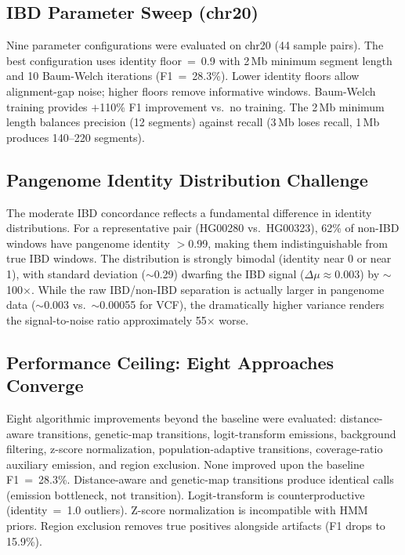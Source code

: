 \documentclass[11pt]{article}
\begin{document}
\subsection{IBD Parameter Sweep (chr20)}
\label{sec:supp_ibd_params}

Nine parameter configurations were evaluated on chr20 (44 sample pairs). The best configuration uses identity floor~=~0.9 with 2\,Mb minimum segment length and 10 Baum-Welch iterations (F1~=~28.3\%). Lower identity floors allow alignment-gap noise; higher floors remove informative windows. Baum-Welch training provides $+$110\% F1 improvement vs.\ no training. The 2\,Mb minimum length balances precision (12 segments) against recall (3\,Mb loses recall, 1\,Mb produces 140--220 segments).

\subsection{Pangenome Identity Distribution Challenge}
\label{sec:supp_identity_dist}

The moderate IBD concordance reflects a fundamental difference in identity distributions. For a representative pair (HG00280 vs.\ HG00323), 62\% of non-IBD windows have pangenome identity $>$0.99, making them indistinguishable from true IBD windows. The distribution is strongly bimodal (identity near 0 or near 1), with standard deviation ($\sim$0.29) dwarfing the IBD signal ($\Delta\mu \approx 0.003$) by $\sim$100$\times$. While the raw IBD/non-IBD separation is actually larger in pangenome data ($\sim$0.003 vs.\ $\sim$0.00055 for VCF), the dramatically higher variance renders the signal-to-noise ratio approximately 55$\times$ worse.

\subsection{Performance Ceiling: Eight Approaches Converge}
\label{sec:supp_ceiling}

Eight algorithmic improvements beyond the baseline were evaluated: distance-aware transitions, genetic-map transitions, logit-transform emissions, background filtering, z-score normalization, population-adaptive transitions, coverage-ratio auxiliary emission, and region exclusion. None improved upon the baseline F1~=~28.3\%. Distance-aware and genetic-map transitions produce identical calls (emission bottleneck, not transition). Logit-transform is counterproductive (identity~=~1.0 outliers). Z-score normalization is incompatible with HMM priors. Region exclusion removes true positives alongside artifacts (F1 drops to 15.9\%).
\end{document}
